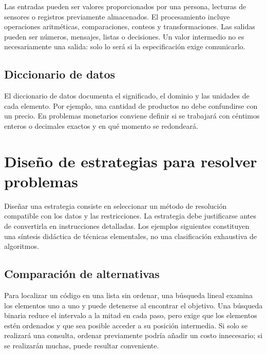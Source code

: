 Las entradas pueden ser valores proporcionados por una persona, lecturas de sensores o registros previamente almacenados. El procesamiento incluye operaciones aritméticas, comparaciones, conteos y transformaciones. Las salidas pueden ser números, mensajes, listas o decisiones. Un valor intermedio no es necesariamente una salida: solo lo será si la especificación exige comunicarlo.



\subsection{Diccionario de datos}

El diccionario de datos documenta el significado, el dominio y las unidades de cada elemento. Por ejemplo, una cantidad de productos no debe confundirse con un precio. En problemas monetarios conviene definir si se trabajará con céntimos enteros o decimales exactos y en qué momento se redondeará.



\section{Diseño de estrategias para resolver problemas}

Diseñar una estrategia consiste en seleccionar un método de resolución compatible con los datos y las restricciones. La estrategia debe justificarse antes de convertirla en instrucciones detalladas. Los ejemplos siguientes constituyen una síntesis didáctica de técnicas elementales, no una clasificación exhaustiva de algoritmos.



\subsection{Comparación de alternativas}

Para localizar un código en una lista sin ordenar, una búsqueda lineal examina los elementos uno a uno y puede detenerse al encontrar el objetivo. Una búsqueda binaria reduce el intervalo a la mitad en cada paso, pero exige que los elementos estén ordenados y que sea posible acceder a su posición intermedia. Si solo se realizará una consulta, ordenar previamente podría añadir un costo innecesario; si se realizarán muchas, puede resultar conveniente.

